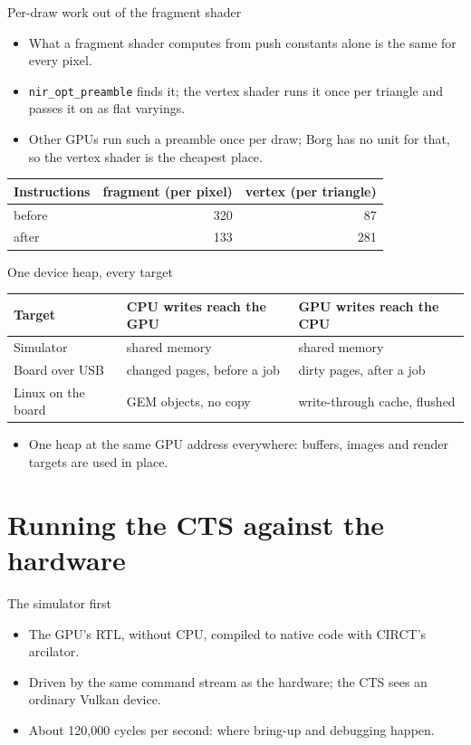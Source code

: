 \documentclass[aspectratio=169,11pt]{beamer}
\begin{document}
\begin{frame}{Per-draw work out of the fragment shader}
  \begin{itemize}
    \item What a fragment shader computes from push constants alone is the same for every pixel.
    \item \texttt{nir\_opt\_preamble} finds it; the vertex shader runs it once per triangle and
      passes it on as flat varyings.
    \item Other GPUs run such a preamble once per draw; Borg has no unit for that, so the vertex
      shader is the cheapest place.
  \end{itemize}
  \centering\small
  \begin{tabular}{lrr}
    \toprule
    Instructions & fragment (per pixel) & vertex (per triangle) \\
    \midrule
    before & 320 & 87 \\
    after  & 133 & 281 \\
    \bottomrule
  \end{tabular}
\end{frame}

\begin{frame}{One device heap, every target}
  \centering\small
  \begin{tabular}{lll}
    \toprule
    Target & CPU writes reach the GPU & GPU writes reach the CPU \\
    \midrule
    Simulator & shared memory & shared memory \\
    Board over USB & changed pages, before a job & dirty pages, after a job \\
    Linux on the board & GEM objects, no copy & write-through cache, flushed \\
    \bottomrule
  \end{tabular}
  \begin{itemize}
    \item One heap at the same GPU address everywhere: buffers, images and render targets are used
      in place.
  \end{itemize}
\end{frame}

\section{Running the CTS against the hardware}

\begin{frame}{The simulator first}
  \begin{itemize}
    \item The GPU's RTL, without CPU, compiled to native code with CIRCT's arcilator.
    \item Driven by the same command stream as the hardware; the CTS sees an ordinary Vulkan device.
    \item About 120,000 cycles per second: where bring-up and debugging happen.
  \end{itemize}
\end{frame}
\end{document}

